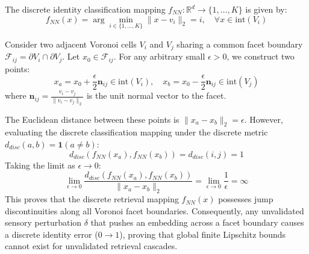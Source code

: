 \documentclass[10pt,journal,compsoc]{IEEEtran}
\begin{document}
The discrete identity classification mapping $f_{NN}: \mathbb{R}^d \to \{1, \dots, K\}$ is given by:
\begin{equation}
f_{NN}(x) = \arg\min_{i \in \{1, \dots, K\}} \|x - v_i\|_2 = i, \quad \forall x \in \text{int}(V_i)
\end{equation}

\begin{IEEEproof}
Consider two adjacent Voronoi cells $V_i$ and $V_j$ sharing a common facet boundary $\mathcal{F}_{ij} = \partial V_i \cap \partial V_j$. Let $x_0 \in \mathcal{F}_{ij}$. For any arbitrary small $\epsilon > 0$, we construct two points:
\begin{equation}
x_a = x_0 + \frac{\epsilon}{2} \mathbf{n}_{ij} \in \text{int}(V_i), \quad x_b = x_0 - \frac{\epsilon}{2} \mathbf{n}_{ij} \in \text{int}(V_j)
\end{equation}
where $\mathbf{n}_{ij} = \frac{v_i - v_j}{\|v_i - v_j\|_2}$ is the unit normal vector to the facet.

The Euclidean distance between these points is $\|x_a - x_b\|_2 = \epsilon$. However, evaluating the discrete classification mapping under the discrete metric $d_{disc}(a, b) = \mathbf{1}(a \neq b)$:
\begin{equation}
d_{disc}(f_{NN}(x_a), f_{NN}(x_b)) = d_{disc}(i, j) = 1
\end{equation}
Taking the limit as $\epsilon \to 0$:
\begin{equation}
\lim_{\epsilon \to 0} \frac{d_{disc}(f_{NN}(x_a), f_{NN}(x_b))}{\|x_a - x_b\|_2} = \lim_{\epsilon \to 0} \frac{1}{\epsilon} = \infty
\end{equation}
This proves that the discrete retrieval mapping $f_{NN}(x)$ possesses jump discontinuities along all Voronoi facet boundaries. Consequently, any unvalidated sensory perturbation $\delta$ that pushes an embedding across a facet boundary causes a discrete identity error ($0 \to 1$), proving that global finite Lipschitz bounds cannot exist for unvalidated retrieval cascades.
\end{IEEEproof}
\end{document}

